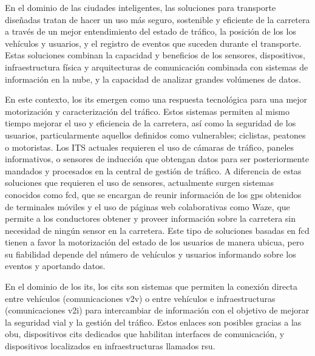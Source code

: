 En el dominio de las ciudades inteligentes, las soluciones para transporte
diseñadas tratan de hacer un uso más seguro, sostenible y eficiente de la
carretera a través de un mejor entendimiento del estado de tráfico, la posición
de los los vehículos y usuarios, y el registro de eventos que suceden durante
el transporte. Estas soluciones combinan la capacidad y beneficios de los
sensores, dispositivos, infraestructura física y arquitecturas de comunicación
combinada con sistemas de información en la nube, y la capacidad de analizar
grandes volúmenes de datos.

En este contexto, los \gls{its} emergen como una respuesta tecnológica para una
mejor motorización y caracterización del tráfico. Estos sistemas permiten al
mismo tiempo mejorar el uso y eficiencia de la carretera, así como la seguridad
de los usuarios, particularmente aquellos definidos como vulnerables; ciclistas,
peatones o motoristas. Los ITS actuales requieren el uso de cámaras de tráfico,
paneles informativos, o sensores de inducción que obtengan datos para ser
posteriormente mandados y procesados en la central de gestión de tráfico. A
diferencia de estas soluciones que requieren el uso de sensores, actualmente
surgen sistemas conocidos como \gls{fcd}, que se encargan de reunir información
de los \gls{gps} obtenidos de terminales móviles y el uso de páginas web
colaborativas como Waze, que permite a los conductores obtener y proveer
información sobre la carretera sin necesidad de ningún sensor en la carretera.
Este tipo de soluciones basadas en \gls{fcd} tienen a favor la motorización del
estado de los usuarios de manera ubicua, pero su fiabilidad depende del número
de vehículos y usuarios informando sobre los eventos y aportando datos.

En el dominio de los \gls{its}, los \gls{cits} son sistemas que permiten la
conexión directa entre vehículos (comunicaciones \gls{v2v}) o entre vehículos e
infraestructuras (comunicaciones \gls{v2i}) para intercambiar de información
con el objetivo de mejorar la seguridad vial y la gestión del tráfico. Estos
enlaces son posibles gracias a las \gls{obu}, dispositivos \gls{cits} dedicados
que habilitan interfaces de comunicación, y dispositivos localizados en
infraestructuras llamados \gls{rsu}.

